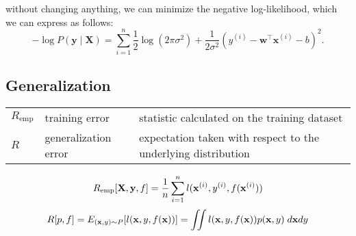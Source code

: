 without changing anything, we can minimize the negative log-likelihood, which we can express as follows:
\[
    \displaystyle
    -\log P(\mathbf y \mid \mathbf X) = \sum_{i=1}^n \frac{1}{2} \log(2 \pi \sigma^2) + \frac{1}{2 \sigma^2} \left(y^{(i)} - \mathbf{w}^\top \mathbf{x}^{(i)} - b\right)^2.
\]

\subsection*{Generalization \cite{dnn-1}}

\begin{customTableWrapper}{1.1}
\begin{table}[H]
    \centering
    \begin{tabular}{l l p{6cm}}
        $R_\textrm{emp}$ & training error & statistic calculated on the training dataset \\
        
        $R$ & generalization error & expectation taken with respect to the underlying distribution \\

    \end{tabular}
\end{table}
\end{customTableWrapper}

\[
    \hfill
    R_\textrm{emp}[\mathbf{X}, \mathbf{y}, f] 
    = \frac{1}{n} \sum_{i=1}^n l(\mathbf{x}^{(i)}, y^{(i)}, f(\mathbf{x}^{(i)}))
    \hfill
\]
\[
    \hfill
    R[p, f] 
    = E_{(\mathbf{x}, y) \sim P} [l(\mathbf{x}, y, f(\mathbf{x}))] 
    = \iint l(\mathbf{x}, y, f(\mathbf{x})) p(\mathbf{x}, y) \;d\mathbf{x} dy
    \hfill
\]

